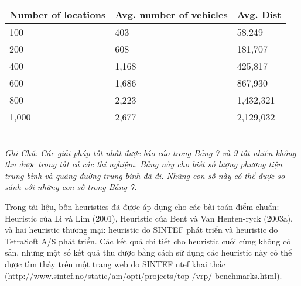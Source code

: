 \begin{table}[caption={Average Performance of the ALNS Heuristic}, label=tab:2]
    \begin{tabular}{lll}
        \toprule
        Number of locations& Avg. number of vehicles & Avg. Dist \\ \midrule
    100 & 403 & 58,249   \\
    200 & 608 & 181,707   \\
    400 & 1,168 & 425,817  \\
    600 & 1,686 & 867,930   \\
    800 & 2,223 & 1,432,321  \\
    1,000 & 2,677 & 2,129,032 \\
    \end{tabular} \\
    \justify
    \textit{Ghi Chú: Các giải pháp tốt nhất được báo cáo trong Bảng 7 và 9 tất nhiên không thu được trong tất cả các thí nghiệm. Bảng này cho biết số lượng phương tiện trung bình và quãng đường trung bình đã đi. Những con số này có thể được so sánh với những con số trong Bảng 7.}
\end{table}

Trong tài liệu, bốn heuristics đã được áp dụng cho các bài toán điểm chuẩn: Heuristic của Li và Lim (2001), Heuristic của Bent và Van Henten-ryck (2003a), và hai heuristic thương mại: heuristic do SINTEF phát triển và heuristic do TetraSoft A/S phát triển. Các kết quả chi tiết cho heuristic cuối cùng không có sẵn, nhưng một số kết quả thu được bằng cách sử dụng các heuristic này có thể được tìm thấy trên một trang web do SINTEF ntef khai thác (http://www.sintef.no/static/am/opti/projects/top /vrp/ benchmarks.html).

